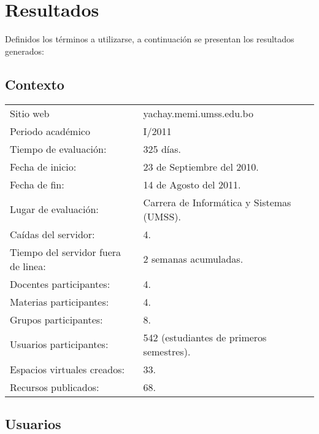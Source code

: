 
\section{Resultados}
Definidos los términos a utilizarse, a continuación se presentan los resultados
generados:

\subsection{Contexto}
\begin{center}
\begin{tabular}{|l|l|}
\hline
Sitio web & yachay.memi.umss.edu.bo \\
Periodo académico & I/2011 \\
Tiempo de evaluación: & 325 días. \\
Fecha de inicio: & 23 de Septiembre del 2010. \\
Fecha de fin: & 14 de Agosto del 2011. \\
Lugar de evaluación: & Carrera de Informática y Sistemas (UMSS). \\
Caídas del servidor: & 4. \\
Tiempo del servidor fuera de linea: & 2 semanas acumuladas. \\
Docentes participantes: & 4. \\
Materias participantes: & 4. \\
Grupos participantes: & 8. \\
Usuarios participantes: & 542 (estudiantes de primeros semestres). \\
Espacios virtuales creados: & 33. \\
Recursos publicados: & 68. \\
\hline
\end{tabular}
\end{center}

\subsection{Usuarios}


